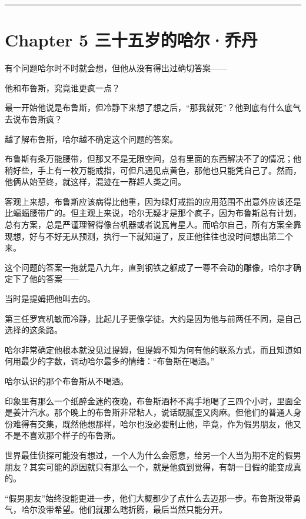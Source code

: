 \documentclass[../main]{subfiles}
\begin{document}
\begin{center}\rule{0.5\linewidth}{0.5pt}\end{center}

\hypertarget{chapter-5-ux4e09ux5341ux4e94ux5c81ux7684ux54c8ux5c14uxb7ux4e54ux4e39}{%
    \section{Chapter 5
      三十五岁的哈尔·乔丹}\label{chapter-5-ux4e09ux5341ux4e94ux5c81ux7684ux54c8ux5c14uxb7ux4e54ux4e39}}

有个问题哈尔时不时就会想，但他从没有得出过确切答案——

他和布鲁斯，究竟谁更疯一点？

最一开始他说是布鲁斯，但冷静下来想了想之后，“那我就死”？他到底有什么底气去说布鲁斯疯？

越了解布鲁斯，哈尔越不确定这个问题的答案。

布鲁斯有条万能腰带，但那又不是无限空间，总有里面的东西解决不了的情况；他稍好些，手上有一枚万能戒指，可但凡遇见点黄色，那他也只能凭自己了。然而，他俩从始至终，就这样，混迹在一群超人类之间。

客观上来想，布鲁斯应该病得比他重，因为绿灯戒指的应用范围不出意外应该还是比蝙蝠腰带广的。但主观上来说，哈尔无疑才是那个疯子，因为布鲁斯总有计划，总有方案，总是严谨理智得像台机器或者说瓦肯星人。而哈尔自己，所有方案全靠现想，好与不好无从预测，执行一下就知道了，反正他往往也没时间想出第二个来。

这个问题的答案一拖就是八九年，直到钢铁之躯成了一尊不会动的雕像，哈尔才确定下了他的答案——

当时是提姆把他叫去的。

第三任罗宾机敏而冷静，比起儿子更像学徒。大约是因为他与前两任不同，是自己选择的这条路。

哈尔非常确定他根本就没见过提姆，但提姆不知为何有他的联系方式，而且知道如何用最少的字数，调动哈尔最多的情绪：“布鲁斯在喝酒。”

哈尔认识的那个布鲁斯从不喝酒。

印象里有那么一个纸醉金迷的夜晚，布鲁斯酒杯不离手地喝了三四个小时，里面全是姜汁汽水。那个晚上的布鲁斯非常粘人，说话既腻歪又肉麻。但他们的普通人身份难得有交集，既然他想那样，哈尔也没必要制止他，毕竟，作为假男朋友，他又不是不喜欢那个样子的布鲁斯。

世界最佳侦探可能没有想过，一个人为什么会愿意，给另一个人当为期不定的假男朋友？其实可能的原因就只有那么一个，就是他疯到觉得，有朝一日假的能变成真的。

“假男朋友”始终没能更进一步，他们大概都少了点什么去迈那一步。布鲁斯没带勇气，哈尔没带希望。他们就那么瞎折腾，最后当然只能分开。
\end{document}
